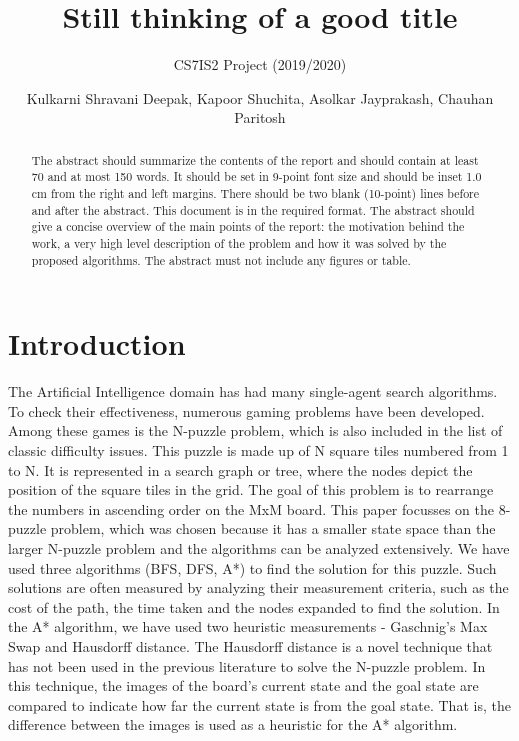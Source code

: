 \documentclass{svproc}
\begin{document}
\mainmatter
\title{Still thinking of a good title}
\subtitle{CS7IS2 Project (2019/2020)}
\author{Kulkarni Shravani Deepak, Kapoor Shuchita, Asolkar Jayprakash, Chauhan Paritosh}



\maketitle

\vspace{0cm}
\begin{abstract}
The abstract should summarize the contents of the report and should contain at least 70 and at most 150 words. It should be set in 9-point font size and should be inset 1.0 cm from the right and left margins. There should be two blank (10-point) lines before and after the abstract. This document is in the required format. The abstract should give a concise overview of the main points of the report: the motivation behind the work, a very high level description of the problem and how it was solved by the proposed algorithms. The abstract must not include any figures or table.
\end{abstract}
%

 

\section{Introduction}
\noindent The Artificial Intelligence domain has had many single-agent search algorithms. To check their effectiveness, numerous gaming problems have been developed. Among these games is the N-puzzle problem, which is also included in the list of classic difficulty issues. This puzzle is made up of N square tiles numbered from 1 to N. It is represented in a search graph or tree, where the nodes depict the position of the square tiles in the grid. The goal of this problem is to rearrange the numbers in ascending order on the MxM board. This paper focusses on the 8-puzzle problem, which was chosen because it has a smaller state space than the larger N-puzzle problem and the algorithms can be analyzed extensively. We have used three algorithms (BFS, DFS, A*) to find the solution for this puzzle. Such solutions are often measured by analyzing their measurement criteria, such as the cost of the path, the time taken and the nodes expanded to find the solution. In the A* algorithm, we have used two heuristic measurements - Gaschnig’s Max Swap and Hausdorff distance. The Hausdorff distance is a novel technique that has not been used in the previous literature to solve the N-puzzle problem. In this technique, the images of the board's current state and the goal state are compared to indicate how far the current state is from the goal state. That is, the difference between the images is used as a heuristic for the A* algorithm. \\
\end{document}
